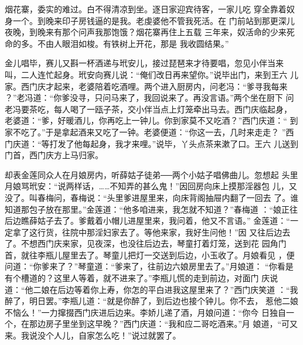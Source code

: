 烟花寨，委实的难过。白不得清凉到坐。逐日家迎宾待客，一家儿吃
穿全靠着奴身一个。到晚来印子房钱逼的是我。老虔婆他不管我死活。在
门前站到那更深儿夜晚，到晚来有那个问声我那饱饿？烟花寨再住上五载
三年来，奴活命的少来死命的多。不由人眼泪如梭。有铁树上开花，那是
我收圆结果。”

金儿唱毕，赛儿又斟一杯酒递与玳安儿，接过琵琶来才待要唱，忽见小伴当来
叫，二人连忙起身。玳安向赛儿说：“俺们改日再来望你。”说毕出门，来到王六
儿家。西门庆才起来，老婆陪着吃酒哩。两个进入厨房内，问老冯：“爹寻我每来
？”老冯道：“你爹没寻，只问马来了，我回说来了。再没言语。”两个坐在厨下
问老冯要茶吃，每人喝了一瓯子茶，交小伴当点上灯笼牵出马去。西门庆临起身，
老婆道：“爹，好暖酒儿，你再吃上一钟儿。你到家莫不又吃酒？”西门庆道：“
到家不吃了。”于是拿起酒来又吃了一钟。老婆便道：“你这一去，几时来走走？
”西门庆道：“等打发了他每起身，我才来哩。”说毕，丫头点茶来漱了口。王六
儿送到门首，西门庆方上马归家。

却表金莲同众人在月娘房内，听薛姑子徒弟──两个小姑子唱佛曲儿。忽想起
头里月娘骂玳安：“说两样话，……不知弄的甚么鬼！”因回房向床上摸那淫器包
儿，又没了。叫春梅问，春梅说：“头里爹进屋里来，向床背阁抽屉内翻了一回去
了。谁知道那包子放在那里。”金莲道：“他多咱进来，我怎就不知道？”春梅道
：“娘正往后边瞧薛姑子去了。爹戴着小帽儿进屋里来，我问着，他又不言语。”
金莲道：“一定拿了这行货，往院中那淫妇家去了。等他来家，我好生问他！”因
又往后边去了。不想西门庆来家，见夜深，也没往后边去，琴童打着灯笼，送到花
园角门首，就往李瓶儿屋里去了。琴童儿把灯一交送到后边，小玉收了。月娘看见
，便问道：“你爹来了？”琴童道：“爹来了，往前边六娘房里去了。”月娘道：
“你看是有个槽道的？这里人等着，就不进来了。”李瓶儿慌的走到前边，对面门
庆说道：“他二娘在后边等着你上寿，你怎的平白进我这屋里来了？”西门庆笑道
：“我醉了，明日罢。”李瓶儿道：“就是你醉了，到后边也接个钟儿。你不去，
惹他二娘不恼么！”一力撺掇西门庆进后边来。李娇儿递了酒，月娘问道：“你今
日独自一个，在那边房子里坐到这早晚？”西门庆道：“我和应二哥吃酒来。”月
娘道，“可又来。我说没个人儿，自家怎么吃！”说过就罢了。


